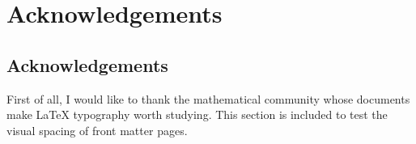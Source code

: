 \chapter*{Acknowledgements}

\section*{Acknowledgements}
First of all, I would like to thank the mathematical community whose documents make LaTeX typography worth studying. This section is included to test the visual spacing of front matter pages.